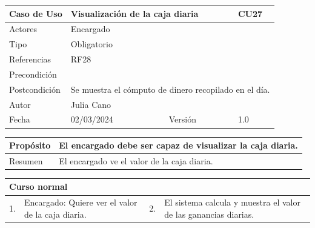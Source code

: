 \newpage


\begin{table}[H]
	\centering
	\begin{tabular}{| m{} | m{} | m{} | m{}|}
		\hline
		\rowcolor{grayshade} Caso de Uso & \multicolumn{2}{|m{0.43\textwidth}|}{Visualización de la caja diaria} &  CU27\\ 
		\hline
		Actores & \multicolumn{3}{l|}{Encargado} \\ 
		\hline
		Tipo & \multicolumn{3}{l|}{Obligatorio} \\ 
		\hline
		Referencias & \multicolumn{3}{l|}{RF28} \\ 
		\hline
		Precondición & \multicolumn{3}{m{0.67\textwidth}|}{} \\ 
		\hline
		Postcondición & \multicolumn{3}{m{0.67\textwidth}|}{Se muestra el cómputo de dinero recopilado en el día.} \\ 
		\hline
		Autor & \multicolumn{3}{l|}{Julia Cano} \\ 
		\hline
		Fecha & 02/03/2024 & Versión & 1.0 \\
		\hline
	\end{tabular}
\end{table}

\begin{table}[H]
	\centering
	\begin{tabular}{| m{} | m{} | m{} | m{} |}
		\hline
		Propósito & \multicolumn{3}{m{0.67\textwidth}|}{El encargado debe ser capaz de visualizar la caja diaria.}  \\ 
		\hline
		Resumen & \multicolumn{3}{m{0.67\textwidth}|}{El encargado ve el valor de la caja diaria.} \\ 
		\hline
	\end{tabular}
\end{table}


\begin{table}[H]
	\centering
	\begin{tabular}{| m{} | m{} | m{} | m{} |}
		\hline
		\multicolumn{4}{|m{0.9\textwidth}|}{Curso normal}     \\ 
		\hline
		1. & Encargado: Quiere ver el valor de la caja diaria. & 2. & El sistema calcula y muestra el valor de las ganancias diarias.  \\ 
		\hline
	\end{tabular}
\end{table}

